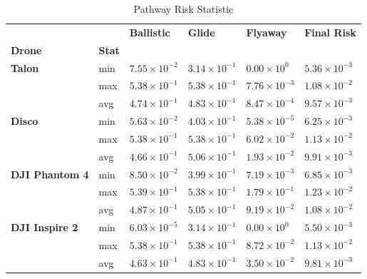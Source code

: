 \documentclass[12pt]{report}
\begin{document}
    \begin{table}[H]
        \centering
        \caption{Pathway Risk Statistic} %
        \begin{tabular}{|l l l l l l |}
            \hline
                  &  & \textbf{Ballistic} & \textbf{Glide} & \textbf{Flyaway} & \textbf{Final Risk} \\
            \textbf{Drone} & \textbf{Stat}  &  &  &  &  \\
            \hline
            \textbf{Talon} & min & \(7.55 \times 10^{-2}\) & \(3.14 \times 10^{-1}\) & \(0.00 \times 10^{0}\) & \(5.36 \times 10^{-3}\) \\
                           & max & \(5.38 \times 10^{-1}\) & \(5.38 \times 10^{-1}\) & \(7.76 \times 10^{-3}\) & \(1.08 \times 10^{-2}\) \\
                           & avg & \(4.74 \times 10^{-1}\) & \(4.83 \times 10^{-1}\) & \(8.47 \times 10^{-4}\) & \(9.57 \times 10^{-3}\) \\
            \hline
            \textbf{Disco} & min & \(5.63 \times 10^{-2}\) & \(4.03 \times 10^{-1}\) & \(5.38 \times 10^{-5}\) & \(6.25 \times 10^{-3}\) \\
                           & max & \(5.38 \times 10^{-1}\) & \(5.38 \times 10^{-1}\) & \(6.02 \times 10^{-2}\) & \(1.13 \times 10^{-2}\) \\
                           & avg & \(4.66 \times 10^{-1}\) & \(5.06 \times 10^{-1}\) & \(1.93 \times 10^{-2}\) & \(9.91 \times 10^{-3}\) \\
            \hline
            \textbf{DJI Phantom 4} & min & \(8.50 \times 10^{-2}\) & \(3.99 \times 10^{-1}\) & \(7.19 \times 10^{-3}\) & \(6.85 \times 10^{-3}\) \\
                                    & max & \(5.39 \times 10^{-1}\) & \(5.38 \times 10^{-1}\) & \(1.79 \times 10^{-1}\) & \(1.23 \times 10^{-2}\) \\
                                    & avg & \(4.87 \times 10^{-1}\) & \(5.05 \times 10^{-1}\) & \(9.19 \times 10^{-2}\) & \(1.08 \times 10^{-2}\) \\
            \hline
            \textbf{DJI Inspire 2} & min & \(6.03 \times 10^{-5}\) & \(3.14 \times 10^{-1}\) & \(0.00 \times 10^{0}\) & \(5.50 \times 10^{-3}\) \\
                                    & max & \(5.38 \times 10^{-1}\) & \(5.38 \times 10^{-1}\) & \(8.72 \times 10^{-2}\) & \(1.13 \times 10^{-2}\) \\
                                    & avg & \(4.63 \times 10^{-1}\) & \(4.83 \times 10^{-1}\) & \(3.50 \times 10^{-2}\) & \(9.81 \times 10^{-3}\) \\

\end{tabular}
\end{table}
\end{document}
